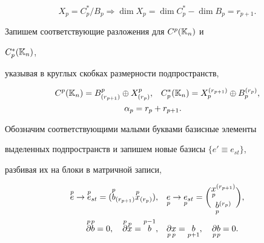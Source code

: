 $$ 


X_p=C_p^*/B_p\Longrightarrow\dim X_p=\dim C_p^*-\dim B_p=r_{p+1}. 


$$


 


Запишем соответствующие разложения для $C^p(\Bbb K_n)$ и 


$C_p^*(\Bbb K_n)$, 


указывая в круглых скобках размерности подпространств,


\begin{gather} 


\begin{split} 


C^p(\Bbb K_n)=B^p_{(r_{p+1})}\oplus X^p_{(r_p)},&\quad 


C_p^*(\Bbb K_n)=X_p^{(r_{p+1})}\oplus B_p^{(r_p)},\\ 


\alpha_p=r_p&+r_{p+1}. 


\end{split} 


\end{gather} 


 


Обозначим соответствующими малыми буквами базисные элементы 


выделенных подпространств и запишем новые базисы $\{e'\equiv e_{st}\}$, 


разбивая их на блоки в матричной записи,


\begin{gather} 


\begin{split} 


\up{p}{e}\to\up{p}{e}_{st}= 


(\up{p}{b}_{(r_{p+1})}\up{p}{x}_{(r_p)}),&\quad 


\down{p}{e}\to\down{p}{e}_{st}= 


\binom{\down{p}{x}^{(r_{p+1})}}{\down{p}{b}^{(r_p)}},\\ 


\up{p}{\partial}\up{p}{b}=0,\quad 


\up{p}{\partial}\up{p}{x}=\up{p-1}{b},&\quad 


\down{p}{\partial}\down{p}{x}=\down{p+1}{b},\quad 


\down{p}{\partial}\down{p}{b}=0. 


\end{split} 


\end{gather} 


